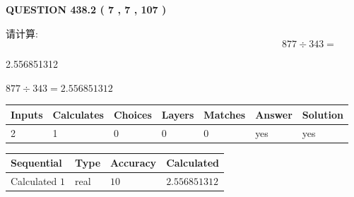 \documentclass{ctexart}
\begin{document}
   
  
\vspace{0.2in}
  
{\textbf{\Large{QUESTION
438.2 
 ( 7 , 7 , 107 )
}}}
  
  
 
请计算:
\begin{equation}
877  \div    %
343 = \nonumber
\end{equation}
 
 
 
\noindent{}
 
 

2.556851312
 
 
\noindent{}
 
 

 
 
 
\noindent{}
 
 

$ %
877 \div  %
343=   %
2.556851312$
 
 
\noindent{}
 
 

 
   
   
   
   
\noindent\begin{tabular}{|l|l|l|l|l|l|l|}
 \hline
Inputs & Calculates & Choices & Layers & Matches & Answer & Solution \\ \hline
 2  & 
 1  & 
 0
  & 
 0  & 
 0  & 
  yes & 
  yes 
  \\ \hline
 \end{tabular}
   
   
   
   
\noindent{}
   
   
  
  
\noindent\begin{tabular}{|l|l|l|l|}
\hline
 Sequential & Type & Accuracy & Calculated \\ 
\hline
 
 
  Calculated $  1 $ & real & $  10  $ & 
 $ 2.556851312 $ 
 \\  \hline  
 \end{tabular}
   
\end{document}
